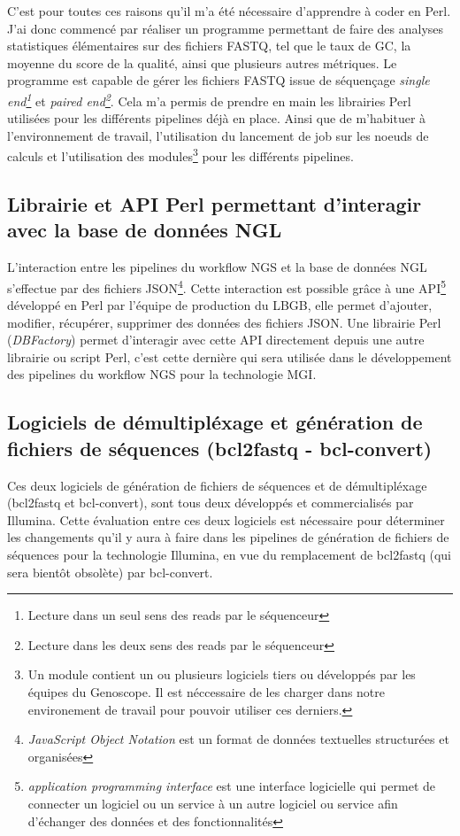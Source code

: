C'est pour toutes ces raisons qu'il m'a été nécessaire d'apprendre à coder en Perl. J'ai donc commencé par réaliser un programme permettant de faire des analyses statistiques élémentaires sur des fichiers FASTQ, tel que le taux de GC, la moyenne du score de la qualité, ainsi que plusieurs autres métriques. Le programme est capable de gérer les fichiers FASTQ issue de séquençage \emph{single end\footnote{Lecture dans un seul sens des reads par le séquenceur}} et \emph{paired end\footnote{Lecture dans les deux sens des reads par le séquenceur}}. Cela m'a permis de prendre en main les librairies Perl utilisées pour les différents pipelines déjà en place. Ainsi que de m'habituer à l'environnement de travail, l'utilisation du lancement de job sur les noeuds de calculs et l'utilisation des modules\footnote{Un module contient un ou plusieurs logiciels tiers ou développés par les équipes du Genoscope. Il est néccessaire de les charger dans notre environement de travail pour pouvoir utiliser ces derniers.} pour les différents pipelines.

\subsection{Librairie et API Perl permettant d'interagir avec la base de données NGL}
L'interaction entre les pipelines du workflow NGS et la base de données NGL s'effectue par des fichiers JSON\footnote{\emph{JavaScript Object Notation} est un format de données textuelles structurées et organisées}.
Cette interaction est possible grâce à une API\footnote{\emph{application programming interface} est une interface logicielle qui permet de \og connecter \fg{} un logiciel ou un service à un autre logiciel ou service afin d'échanger des données et des fonctionnalités} développé en Perl par l'équipe de \og production\fg{} du LBGB, elle permet d'ajouter, modifier, récupérer, supprimer des données des fichiers JSON. Une librairie Perl (\emph{DBFactory}) permet d'interagir avec cette API directement depuis une autre librairie ou script Perl, c'est cette dernière qui sera utilisée dans le développement des pipelines du workflow NGS pour la technologie MGI.

\subsection{Logiciels de démultipléxage et génération de fichiers de séquences (bcl2fastq - bcl-convert)}
\label{DBFactory}
Ces deux logiciels de génération de fichiers de séquences et de démultipléxage (bcl2fastq et bcl-convert), sont tous deux développés et commercialisés par Illumina. Cette évaluation entre ces deux logiciels est nécessaire pour déterminer les changements qu'il y aura à faire dans les pipelines de génération de fichiers de séquences pour la technologie Illumina, en vue du remplacement de bcl2fastq (qui sera bientôt obsolète) par bcl-convert.

